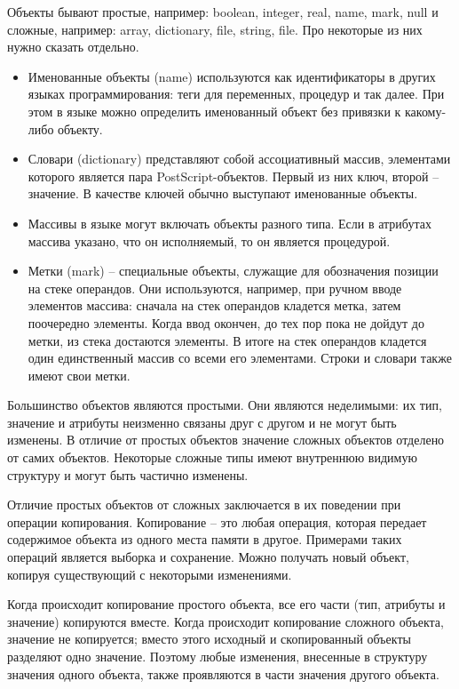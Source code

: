 Объекты бывают простые, например: boolean, integer, real, name, mark, null и сложные, например: array, dictionary, file, string, file. Про некоторые из них нужно сказать отдельно.
\begin{itemize}
\item Именованные объекты (name) используются как идентификаторы в других языках программирования: теги для переменных, процедур и так далее. При этом в языке можно определить именованный объект без привязки к какому-либо объекту.
\item Словари (dictionary) представляют собой ассоциативный массив, элементами которого является пара PostScript-объектов. Первый из них ключ, второй -- значение. В качестве ключей обычно выступают именованные объекты.
\item Массивы в языке могут включать объекты разного типа. Если в атрибутах массива указано, что он исполняемый, то он является процедурой.
\item Метки (mark) -- специальные объекты, служащие для обозначения позиции на стеке операндов. Они используются, например, при ручном вводе элементов массива: сначала на стек операндов кладется метка, затем поочередно элементы. Когда ввод окончен, до тех пор пока не дойдут до метки, из стека достаются элементы. В итоге на стек операндов кладется один единственный массив со всеми его элементами. Строки и словари также имеют свои метки.
\end{itemize}

Большинство объектов являются простыми. Они являются неделимыми: их тип, значение и атрибуты неизменно связаны друг с другом и не могут быть изменены. В отличие от простых объектов значение сложных объектов отделено от самих объектов. Некоторые сложные типы имеют внутреннюю видимую структуру и могут быть частично изменены.

Отличие простых объектов от сложных заключается в их поведении при операции копирования. Копирование – это любая операция, которая передает содержимое объекта из одного места памяти в другое. Примерами таких операций является выборка и сохранение. Можно получать новый объект, копируя существующий с некоторыми изменениями.

Когда происходит копирование простого объекта, все его части (тип, атрибуты и значение) копируются вместе. Когда происходит копирование сложного объекта, значение не копируется; вместо этого исходный и скопированный объекты разделяют одно значение.  Поэтому любые изменения, внесенные в структуру значения одного объекта, также проявляются в части значения другого объекта.

